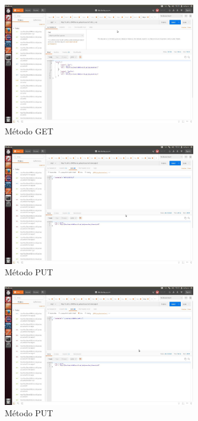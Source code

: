 \documentclass[12pt,a4paper, spanish]{article}
\begin{document}
\begin{figure}[H]
	\centering
	\includegraphics[width=0.75\textwidth]{images/captura15.jpg}
	\caption{Método GET}
\end{figure}

\begin{figure}[H]
	\centering
	\includegraphics[width=0.75\textwidth]{images/captura16.jpg}
	\caption{Método PUT}
\end{figure}

\begin{figure}[H]
	\centering
	\includegraphics[width=0.75\textwidth]{images/captura17.jpg}
	\caption{Método PUT}
\end{figure}
\end{document}
